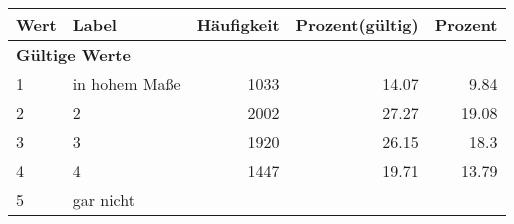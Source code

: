      \begin{longtable}{lXrrr}
     \toprule
     \textbf{Wert} & \textbf{Label} & \textbf{Häufigkeit} & \textbf{Prozent(gültig)} & \textbf{Prozent} \\
     \endhead
     \midrule
     \multicolumn{5}{l}{\textbf{Gültige Werte}}\\

     1 &
     \multicolumn{1}{X}{ in hohem Maße   } &


       \num{1033} &
       \num[round-mode=places,round-precision=2]{14,07} &
         \num[round-mode=places,round-precision=2]{9,84} \\

     2 &
     \multicolumn{1}{X}{ 2   } &


       \num{2002} &
       \num[round-mode=places,round-precision=2]{27,27} &
         \num[round-mode=places,round-precision=2]{19,08} \\

     3 &
     \multicolumn{1}{X}{ 3   } &


       \num{1920} &
       \num[round-mode=places,round-precision=2]{26,15} &
         \num[round-mode=places,round-precision=2]{18,3} \\

     4 &
     \multicolumn{1}{X}{ 4   } &


       \num{1447} &
       \num[round-mode=places,round-precision=2]{19,71} &
         \num[round-mode=places,round-precision=2]{13,79} \\

     5 &
     \multicolumn{1}{X}{ gar nicht   } &



\end{longtable}
